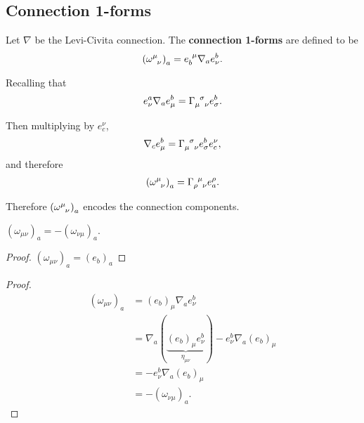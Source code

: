 
\subsection{Connection 1-forms}

\begin{definition}
    Let $\nabla$ be the Levi-Civita connection. The \textbf{connection 1-forms} are defined to be
\begin{align}
    \left( \tensor{\omega}{^{\mu}_\nu} \right)_a = \tensor{e}{_b^{\mu}} \nabla_a e^{b}_\nu
.\end{align}
\end{definition}

Recalling that
\begin{align}
    e^{a}_\nu \nabla_a e^{b}_\mu = \tensor{\Gamma}{_{\mu}^{\sigma}_\nu} e^{b}_\sigma
.\end{align}

Then multiplying by $e_c^{\nu}$,
\begin{align}
    \nabla_c e^{b}_\mu = \tensor{\Gamma}{_\mu^{\sigma}_\nu} e^{b}_\sigma e_c^{\nu}
,\end{align}
and therefore
\begin{align}
    \left( \tensor{\omega}{^{\mu}_\nu} \right)_a = \tensor{\Gamma}{_{\rho}^{\mu}_\nu} e^{\rho}_a
.\end{align}

Therefore $\left(  \tensor{\omega}{^{\mu}_\nu}\right)_a$ encodes the connection components.

\begin{lemma}
    $\left( \omega_{\mu \nu} \right)_a = - \left( \omega_{\nu \mu} \right)_a$.
\end{lemma}

\begin{proof}
    $\left( \omega_{\mu \nu} \right)_a = \left( e_b \right)_{a}$
\end{proof}

\begin{proof}
    \begin{align}
        \left( \omega_{\mu \nu} \right)_a &= \left( e_{b} \right)_{\mu} \nabla_a e^{b}_\nu  \\
        &= \nabla_a \left( \underbrace{\left( e_b \right)_\mu e^{b}_\nu}_{\eta_{\mu \nu}} \right) - e^{b}_\nu \nabla_a \left( e_b \right)_\mu \\
        &= -e^{b}_\nu \nabla_a \left( e_b \right)_{\mu} \\
        &= -\left( \omega_{\nu \mu} \right)_a 
    .\end{align}
\end{proof}

